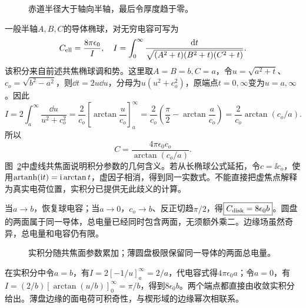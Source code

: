 \begin{figure}[H]\centering
{}
\caption{赤道半径大于轴向半轴，最后令厚度趋于零。}\label{fig:es3-e10-q}
\end{figure}
\begin{solution}
一般半轴$A,B,C$的导体椭球，对无穷电容可写为
\[C_{\rm ell}=\frac{8\pi\epsilon_0}{I},\quad
I=\int_0^\infty\frac{\mathop{}\!\mathrm d t}{\sqrt{(A^2+t)(B^2+t)(C^2+t)}}.
\]
该积分来自前述共焦椭球调和势。这里取$A=B=b,C=a$，令$u=\sqrt{a^2+t}$、$c_o=\sqrt{b^2-a^2}$，则$\dd t=2u\dd u$，分母为$u(u^2+c_o^2)$，原端点$t=0,\infty$变为$u=a,\infty$。因此
\[I=2\int_a^\infty\frac{\dd u}{u^2+c_o^2}
=\frac2{c_o}\left[\arctan\frac{u}{c_o}\right]_a^\infty
=\frac2{c_o}\left(\frac\pi2-\arctan\frac a{c_o}\right)
=\frac2{c_o}\arctan(c_o/a).
\]
所以
\[\boxed{C=\frac{4\pi\epsilon_0c_o}{\arctan(c_o/a)}}.
\]
图~\ref{fig:es3-e10-s}中虚线共焦面说明积分参数的几何含义。若从长椭球公式延拓，令$c=\ii c_o$，使用$\operatorname{artanh}(\mathrm i t)=\mathrm i\arctan t$，虚因子相消，得到同一实数式。不能直接把虚焦点解释为真实电荷位置，实积分已提供无此歧义的计算。

当$a\to b$，恢复球电容；当$a\to0$，$c_o\to b$、反正切趋$\pi/2$，得$\boxed{C_{\rm disk}=8\epsilon_0b}$。圆盘的两面属于同一导体，总电量已经同时包含两面，无须额外乘二。边缘场虽然奇异，总电量和电容仍有限。
\begin{figure}[H]\centering
{}
\caption{实积分随共焦面参数累加；薄圆盘极限保留同一导体的两面总电量。}\label{fig:es3-e10-s}
\end{figure}


在实积分中令$a=b$，有$I=2[-1/u]_a^\infty=2/a$，代电容式得$4\pi\epsilon_0a$；令$a=0$，有$I=(2/b)[\arctan(u/b)]_0^\infty=\pi/b$，得到$8\epsilon_0b$。两个端点都直接由收敛实积分给出。薄盘边缘的面电荷可积奇性，与楔形域的边缘幂次相联系。
\end{solution}


